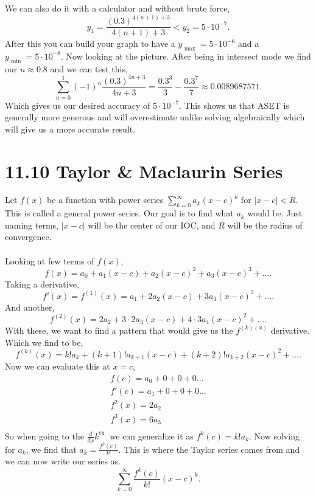 \documentclass{report}
\begin{document}
We can also do it with a calculator and without brute force,
\[
y_1 = \frac{ \left( 0.3 \right) ^{ 4\left( n+1 \right) +3 } }{ 4\left( n+1 \right) +3 }< y_2 = 5\cdot 10^{ -7 }
.\] 
After this you can build your graph to have a $ y_{ \text{ max } }= 5\cdot 10^{ -6 } $ and a $ y_{ \text{ min } }= 5\cdot 10^{ -8 } $. Now looking at the picture. After being in intersect mode we find our $ n\approx 0.8 $ and we can test this,
\[
\sum_{ n=0 } ^{ 1 } \left( -1 \right) ^{ n } \frac{ \left( 0.3 \right) ^{ 4n+3 } }{ 4n+3 } = \frac{ 0.3^{ 3 } }{ 3 }- \frac{ 0.3^{ 7 } }{ 7 } \approx 0.0089687571
.\] 
Which gives us our desired accuracy of $ 5\cdot 10^{ -7 } $. This shows us that ASET is generally more generous and will overestimate unlike solving algebraically which will give us a more accurate result.
\section{11.10 Taylor \& Maclaurin Series}%
Let $ f\left( x \right)  $ be a function with power series $ \sum_{ k=0 } ^{ \infty } a_k\left( x-c \right) ^{ k } $ for $ \left| x-c \right|<R $. This is called a general power series. Our goal is to find what $ a_k $ would be. Just naming terms, $ \left| x-c \right| $ will be the center of our IOC, and $ R $ will be the radius of convergence. \\ \\

Looking at few terms of $ f\left( x \right)  $,
\[
f\left( x \right) =a_0 + a_1\left( x-c \right) + a_2\left( x-c \right) ^{ 2 } + a_3\left( x-c \right) ^{ 3 } + \ldots
.\] 
Taking a derivative,
\[
f'\left( x \right) = f^{ \left( 1 \right)  }\left( x \right) = a_1 + 2a_2\left( x-c \right) + 3a_3\left( x-c \right) ^{ 2 } + \ldots
.\] 
And another,
\[
f^{ \left( 2 \right)  }\left( x \right) = 2a_2 + 3\cdot 2a_3\left( x-c \right) + 4\cdot 3a_4\left( x-c \right) ^{ 2 } + \ldots
.\] 
With these, we want to find a pattern that would give us the $ f^{ \left( k \right) \left( x \right)  } $ derivative. Which we find to be,
\[
f^{ \left( k \right)  }\left( x \right) = k!a_k + \left( k+1 \right)! a_{ k+1 }\left( x-c \right) + \left( k+2 \right) ! a_{ k+2 }\left( x-c \right) ^2 + \ldots
.\] 
Now we can evaluate this at $ x=c $,
\begin{gather*}
f\left( c \right) =a_0 + 0 + 0 + 0\ldots \\
f'\left( c \right) = a_1 + 0 + 0 + 0 \ldots \\
f^{ 2 }\left( x \right) = 2a_2 \\
f^{ 3 }\left( x \right) = 6a_3 \\
\end{gather*}
So when going to the $ \frac{ d }{ dx } k^{ \text{th } } $ we can generalize it as $ f^{ k }\left( c \right) = k!a_k $. Now solving for $ a_k $, we find that $ a_k=\frac{ f^{ k }\left( c \right)  }{ k! } $. This is where the Taylor series comes from and we can now write our series as.
\[
\sum_{ k=0 } ^{ \infty } \frac{ f^{ k }\left( c \right)  }{ k! }\left( x-c \right) ^{ k }
.\] 
\end{document}
